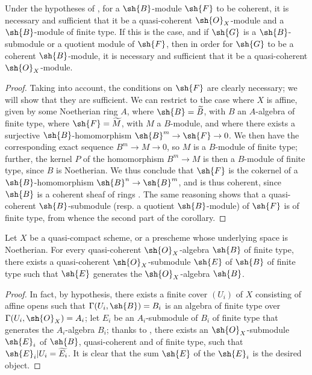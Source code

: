 \begin{corollary}[9.6.4]
\label{I.9.6.4}
Under the hypotheses of , for a $\sh{B}$-module $\sh{F}$ to be coherent, it is necessary and sufficient that it be a quasi-coherent $\sh{O}_X$-module and a $\sh{B}$-module of finite type.
If this is the case, and if $\sh{G}$ is a $\sh{B}$-submodule or a quotient module of $\sh{F}$, then in order for $\sh{G}$ to be a coherent $\sh{B}$-module, it is necessary and sufficient that it be a quasi-coherent $\sh{O}_X$-module.
\end{corollary}

\begin{proof}
Taking  into account, the conditions on $\sh{F}$ are clearly necessary; we will show that they are sufficient.
We can restrict to the case where $X$ is affine, given by some Noetherian ring $A$, where $\sh{B}=\widetilde{B}$, with $B$ an $A$-algebra of finite type, where $\sh{F}=\widetilde{M}$, with $M$ a $B$-module, and where there exists a surjective $\sh{B}$-homomorphism $\sh{B}^m\to\sh{F}\to0$.
We then have the corresponding exact sequence $B^m\to M\to0$, so $M$ is a $B$-module of finite type; further, the kernel $P$ of the homomorphism $B^m\to M$ is then a $B$-module of finite type, since $B$ is Noetherian.
We thus conclude  that $\sh{F}$ is the cokernel of a $\sh{B}$-homomorphism $\sh{B}^n\to\sh{B}^m$, and is thus coherent, since $\sh{B}$ is a coherent sheaf of rings .
The same reasoning shows that a quasi-coherent $\sh{B}$-submodule (resp. a quotient $\sh{B}$-module) of $\sh{F}$ is of finite type, from whence the second part of the corollary.
\end{proof}

\begin{proposition}[9.6.5]
\label{I.9.6.5}
Let $X$ be a quasi-compact scheme, or a prescheme whose underlying space is Noetherian.
For every quasi-coherent $\sh{O}_X$-algebra $\sh{B}$ of finite type, there exists a quasi-coherent $\sh{O}_X$-submodule $\sh{E}$ of $\sh{B}$ of finite type such that $\sh{E}$ generates  the $\sh{O}_X$-algebra $\sh{B}$.
\end{proposition}

\begin{proof}
In fact, by hypothesis, there exists a finite cover $(U_i)$ of $X$ consisting of affine opens such that $\Gamma(U_i,\sh{B})=B_i$ is an algebra of finite type over $\Gamma(U_i,\sh{O}_X)=A_i$; let $E_i$ be an $A_i$-submodule of $B_i$ of finite type that generates the $A_i$-algebra $B_i$; thanks to , there exists an $\sh{O}_X$-submodule $\sh{E}_i$ of $\sh{B}$, quasi-coherent and of finite type, such that $\sh{E}_i|U_i=\widetilde{E_i}$.
It is clear that the sum $\sh{E}$ of the $\sh{E}_i$ is the desired object.
\end{proof}

